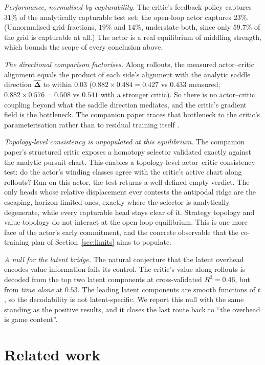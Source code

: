 \documentclass[twoside,11pt]{article}
\newcommand{\Dl}{\bm{\Delta}}
\begin{document}
\emph{Performance, normalised by capturability.}  The critic's
feedback policy captures $31\%$ of the analytically capturable test
set; the open-loop actor captures $23\%$.  (Unnormalised grid
fractions, $19\%$ and $14\%$, understate both, since only $59.7\%$
of the grid is capturable at all.)  The actor is a real equilibrium of
middling strength, which bounds the scope of every conclusion above.

\emph{The directional comparison factorises.}  Along rollouts, the
measured actor--critic alignment equals the product of each side's
alignment with the analytic saddle direction $\widehat{\Dl}$ to
within $0.03$ ($0.882 \times 0.484 = 0.427$ vs $0.433$ measured;
$0.882 \times 0.576 = 0.508$ vs $0.541$ with a stronger critic).  So
there is no actor--critic coupling beyond what the saddle direction
mediates, and the critic's gradient field is the bottleneck.  The
companion paper traces that bottleneck to the critic's parameterisation
rather than to residual training itself \citep{companion2026critics}.

\emph{Topology-level consistency is unpopulated at this
equilibrium.}  The companion paper's structured critic exposes a
homotopy selector validated exactly against the analytic pursuit
chart.  This enables a topology-level actor--critic consistency test:
do the actor's winding classes agree with the critic's active chart
along rollouts?  Run on this actor, the test returns a well-defined
empty verdict.  The only heads whose relative displacement ever
contests the antipodal ridge are the escaping, horizon-limited ones,
exactly where the selector is analytically degenerate, while every
capturable head stays clear of it.  Strategy topology and value
topology do not interact at the open-loop equilibrium.  This is one
more face of the actor's early commitment, and the concrete observable
that the co-training plan of Section~\ref{sec:limits} aims to
populate.

\emph{A null for the latent bridge.}  The natural conjecture that the
latent overhead encodes value information fails its control.  The
critic's value along rollouts is decoded from the top two latent
components at cross-validated $R^{2} = 0.46$, but from \emph{time
alone} at $0.53$.  The leading latent components are smooth functions
of $t$, so the decodability is not latent-specific.  We report this
null with the same standing as the positive results, and it closes the
last route back to ``the overhead is game content''.

\section{Related work}
\label{sec:related}
\end{document}
